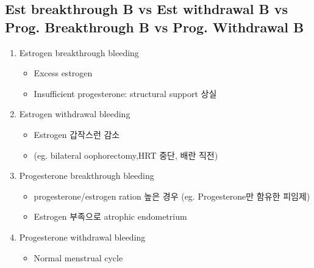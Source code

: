 \subsection{Est breakthrough B vs Est withdrawal B vs Prog. Breakthrough B vs Prog. Withdrawal B}
\begin{enumerate}\tightlist
\item Estrogen breakthrough bleeding
	\begin{itemize}[-]\tightlist
	\item Excess estrogen
	\item Insufficient progesterone: structural support 상실
	\end{itemize}
\item Estrogen withdrawal bleeding
	\begin{itemize}[-]\tightlist
	\item Estrogen 갑작스런 감소
	\item (eg. bilateral oophorectomy,HRT 중단, 배란 직전) 
	\end{itemize}
\item Progesterone breakthrough bleeding
	\begin{itemize}[-]\tightlist
	\item progesterone/estrogen ration 높은 경우 (eg. Progesterone만 함유한 피임제) 
	\item Estrogen 부족으로 atrophic endometrium
	\end{itemize}
\item Progesterone withdrawal bleeding
	\begin{itemize}[-]\tightlist
	\item Normal menstrual cycle
	\end{itemize}
\end{enumerate}	